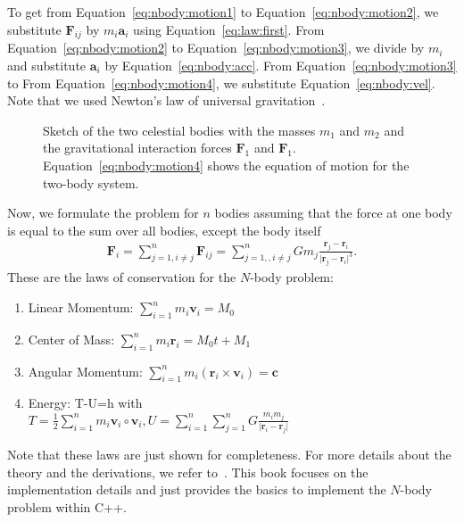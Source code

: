 \documentclass[11pt,fleqn]{book} %
\begin{document}
To get from Equation~\eqref{eq:nbody:motion1} to Equation~\eqref{eq:nbody:motion2}, we substitute $\mathbf{F}_{ij}$ by $m_i \mathbf{a}_i$ using Equation~\ref{eq:law:first}.  From Equation~\eqref{eq:nbody:motion2} to Equation~\eqref{eq:nbody:motion3}, we divide by $m_i$ and substitute $\mathbf{a}_i$ by Equation~\ref{eq:nbody:acc}. From Equation~\eqref{eq:nbody:motion3} to From Equation~\eqref{eq:nbody:motion4}, we substitute Equation~\ref{eq:nbody:vel}. Note that we used Newton's law of universal gravitation~\cite{newton1833philosophiae}.\\


\begin{figure}[tb]
\centering
{}
\caption{Sketch of the two celestial bodies with the masses $m_1$ and $m_2$ and the gravitational interaction forces $\mathbf{F}_1$ and $\mathbf{F}_1$. Equation~\ref{eq:nbody:motion4} shows the equation of motion for the two-body system.   }
\label{fig:nbody:motion}
\end{figure}

Now, we formulate the problem for $n$ bodies assuming that the force at one body is equal to the sum over all bodies, except the body itself
\begin{align}
\mathbf{F}_i = \sum\limits_{j=1,i\neq j}^n \mathbf{F}_{ij} = \sum\limits_{j=1,,i\neq j}^n G  m_j \frac{\mathbf{r}_j - \mathbf{r}_i}{\vert \mathbf{r}_j - \mathbf{r}_i\vert^3} \text{.} \label{eq:nbody:motion}
\end{align}
These are the laws of conservation for the $N$-body problem:
\begin{enumerate}
\item Linear Momentum: $\sum\limits_{i=1}^n m_i \mathbf{v}_i = M_0$
\item Center of Mass: $\sum\limits_{i=1}^n m_i \mathbf{r}_i = M_0 t + M_1$
\item Angular Momentum: $\sum\limits_{i=1}^n m_i (\mathbf{r}_i \times \mathbf{v}_i) = \mathbf{c}$
\item Energy: T-U=h with \\
$ T = \frac{1}{2} \sum\limits_{i=1}^n m_i \mathbf{v}_i \circ \mathbf{v}_i  , U= \sum\limits_{i=1}^n \sum\limits_{j=1}^n G \frac{m_i m_j}{\vert\mathbf{r}_i - \mathbf{r}_j\vert} $
\end{enumerate}
Note that these laws are just shown for completeness. For more details about the theory and the derivations, we refer to~\cite{aarseth2008cambridge,aarseth2003gravitational}. This book focuses on the implementation details and just provides the basics to implement the $N$-body problem within C++.
\end{document}
